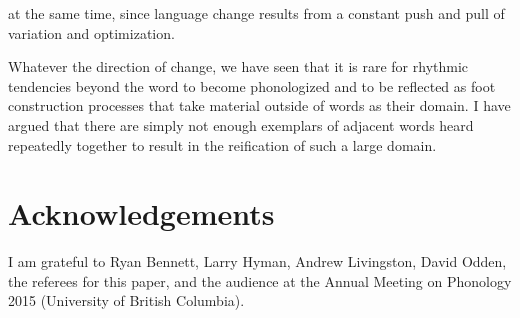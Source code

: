 \documentclass[output=paper,
modfonts
]{LSP/langsci}
\begin{document}
at the same time, since language change results from a constant push and pull of variation and optimization. 

Whatever the direction of change, we have seen that it is rare for rhythmic tendencies beyond the word to become phonologized and to be reflected as foot construction processes that take material outside of words as their domain. I have argued that there are simply not enough exemplars of adjacent words heard repeatedly together to result in the reification of such a large domain.

\section*{Acknowledgements}
I am grateful to Ryan Bennett, Larry Hyman, Andrew Livingston, David Odden, the referees for this paper, and the audience at the Annual Meeting on Phonology 2015 (University of British Columbia).

\printbibliography[heading=subbibliography,notkeyword=this]
\end{document}
